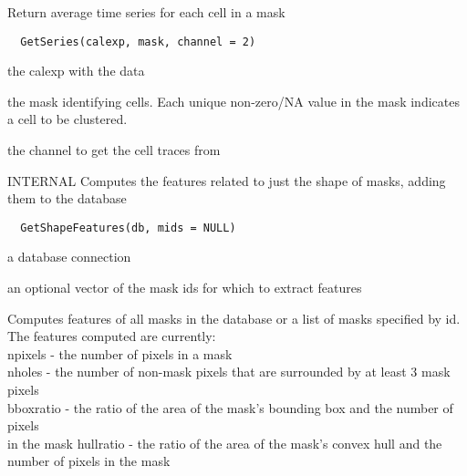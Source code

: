 \documentclass[a4paper]{book}
\begin{document}
%
\begin{Description}\relax
Return average time series for each cell in a mask
\end{Description}
%
\begin{Usage}
\begin{verbatim}
  GetSeries(calexp, mask, channel = 2)
\end{verbatim}
\end{Usage}
%
\begin{Arguments}
\begin{ldescription}
\item[\code{calexp}] the calexp with the data

\item[\code{mask}] the mask identifying cells.  Each unique
non-zero/NA value in the mask indicates a cell to be
clustered.

\item[\code{channel}] the channel to get the cell traces from
\end{ldescription}
\end{Arguments}
%
\begin{Description}\relax
INTERNAL Computes the features related to just the shape
of masks, adding them to the database
\end{Description}
%
\begin{Usage}
\begin{verbatim}
  GetShapeFeatures(db, mids = NULL)
\end{verbatim}
\end{Usage}
%
\begin{Arguments}
\begin{ldescription}
\item[\code{db}] a database connection

\item[\code{mids}] an optional vector of the mask ids for which
to extract features
\end{ldescription}
\end{Arguments}
%
\begin{Details}\relax
Computes features of all masks in the database or a list
of masks specified by id.  The features computed are
currently:\\{} npixels - the number of pixels in a mask
\\{} nholes - the number of non-mask pixels that are
surrounded by at least 3 mask pixels\\{} bboxratio - the
ratio of the area of the mask's bounding box and the
number of pixels\\{} in the mask hullratio - the ratio of
the area of the mask's convex hull and the number of
pixels in the mask\\{}
\end{Details}
\end{document}
